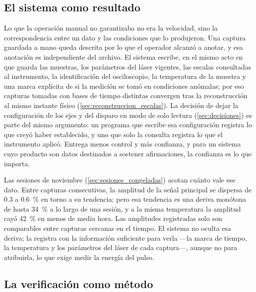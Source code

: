 \subsection*{El sistema como resultado}

Lo que la operación manual no garantizaba no era la velocidad, sino la
correspondencia entre un dato y las condiciones que lo produjeron. Una
captura guardada a mano queda descrita por lo que el operador alcanzó a
anotar, y esa anotación es independiente del archivo. El sistema escribe,
en el mismo acto en que guarda las muestras, los parámetros del láser
vigentes, las escalas consultadas al instrumento, la identificación del
osciloscopio, la temperatura de la muestra y una marca explícita de si
la medición se tomó en condiciones anómalas; por eso capturas tomadas
con bases de tiempo distintas convergen tras la reconstrucción al mismo
instante físico (\cref{sec:reconstruccion_escalas}). La decisión de
dejar la configuración de los ejes y del disparo en modo de solo
lectura (\cref{sec:decisiones}) es parte del mismo argumento: un
programa que escribe esa configuración registra lo que creyó haber
establecido, y uno que solo la consulta registra lo que el instrumento
aplicó. Entrega menos control y más confianza, y para un sistema cuyo
producto son datos destinados a sostener afirmaciones, la confianza es
lo que importa.

Las sesiones de noviembre (\cref{sec:sesiones_congeladas}) acotan
cuánto vale ese dato. Entre capturas consecutivas, la amplitud de la
señal principal se dispersa de 0.3 a \SI{0.6}{\percent} en torno a su
tendencia; pero esa tendencia es una deriva monótona de hasta
\SI{34}{\percent} a lo largo de una sesión, y a la misma temperatura la
amplitud cayó \SI{42}{\percent} en menos de media hora. Las amplitudes
registradas solo son comparables entre capturas cercanas en el tiempo.
El sistema no oculta esa deriva; la registra con la información
suficiente para verla ---la marca de tiempo, la temperatura y los
parámetros del láser de cada captura---, aunque no para atribuirla, lo
que exige medir la energía del pulso.

\subsection*{La verificación como método}

